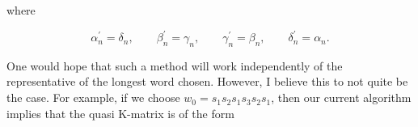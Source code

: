 \documentclass[a4 paper, 10pt]{article}
\theoremstyle{definition}
\theoremstyle{remark}
\numberwithin{equation}{section}
\begin{document}
where 

\begin{equation*}
	\alpha_{n}^{\prime} = \delta_n, \qquad 		
	\beta_{n}^{\prime} = \gamma_n, \qquad
	\gamma_{n}^{\prime} = \beta_n, \qquad		
	\delta_{n}^{\prime} = \alpha_n.
\end{equation*}

One would hope that such a method will work independently of the representative of the longest word chosen. However, I believe this to not quite be the case. For example, if we choose $w_0 = s_1s_2s_1s_3s_2s_1$, then our current algorithm implies that the quasi K-matrix is of the form

\begin{equation}

\end{equation}
\end{document}
